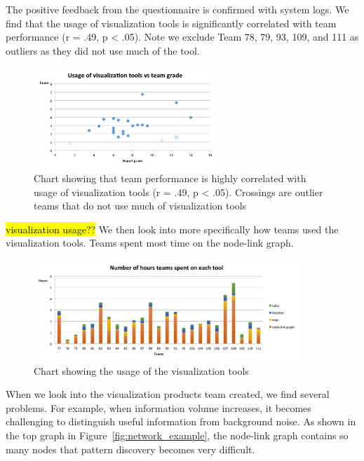 

The positive feedback from the questionnaire is confirmed with system logs. We find that the usage of visualization tools is significantly correlated with team performance (r = .49, p < .05). Note we exclude Team 78, 79, 93, 109, and 111 as outliers as they did not use much of the tool. 

\begin{figure}
	\centering
	\includegraphics[height=1.5in]{img/vis_correlate_perf}
	\caption{Chart showing that team performance is highly correlated with usage of visualization tools (r = .49, p < .05). Crossings are outlier teams that do not use much of visualization tools}
\end{figure}

\hl{visualization usage??}
We then look into more specifically how teams used the visualization tools. Teams spent most time on the node-link graph. 

\begin{figure}
	\centering
	\includegraphics[height=1.5in]{img/vis_usage}
	\caption{Chart showing the usage of the visualization tools}
\end{figure}

When we look into the visualization products team created, we find several problems. For example, when information volume increases, it becomes challenging to distinguish useful information from background noise. As shown in the top graph in Figure~\ref{fig:network_example}, the node-link graph contains so many nodes that pattern discovery becomes very difficult.



